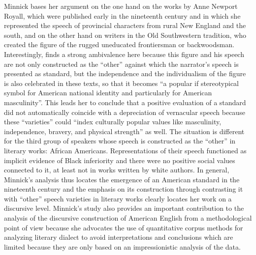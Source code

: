 Minnick bases her argument on the one hand on the works by Anne Newport Royall, which were published early in the nineteenth century and in which she represented the speech of provincial characters from rural New England and the south, and on the other hand on writers in the Old Southwestern tradition, who created the figure of the rugged uneducated frontiersman or backwoodsman. Interestingly, \citet[178--179]{Minnick2010} finds a strong ambivalence here because this figure and his speech are not only constructed as the “other” against which the narrator’s speech is presented as standard, but the independence and the individualism of the figure is also celebrated in these texts, so that it becomes “a popular if stereotypical symbol for American national identity and particularly for American masculinity”. This leads her to conclude that a positive evaluation of a standard did not automatically coincide with a depreciation of vernacular speech because these “varieties” could “index culturally popular values like masculinity, independence, bravery, and physical strength” \citep[180-181]{Minnick2010} as well. The situation is different for the third group of speakers whose speech is constructed as the “other” in literary works: African Americans. Representations of their speech functioned as implicit evidence of Black inferiority and there were no positive social values connected to it, at least not in works written by white authors. In general, Minnick’s analysis thus locates the emergence of an American standard in the nineteenth century and the emphasis on its construction through contrasting it with “other” speech varieties in literary works clearly locates her work on a discursive level. Minnick’s study also provides an important contribution to the analysis of the discursive construction of American English from a methodological point of view because she advocates the use of quantitative corpus methods for analyzing literary dialect to avoid interpretations and conclusions which are limited because they are only based on an impressionistic analysis of the data.


